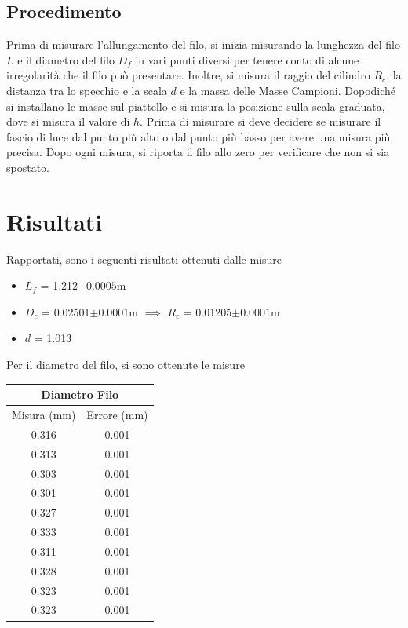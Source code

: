 \documentclass[a4paper]{article}
\begin{document}
\subsection{Procedimento}
Prima di misurare l'allungamento del filo, si inizia misurando la lunghezza del filo $L$ e il diametro del filo $D_f$ in vari punti diversi per tenere conto di alcune irregolarità che il filo può presentare. Inoltre, si misura il raggio del cilindro $R_c$, la distanza tra lo specchio e la scala $d$ e la massa delle Masse Campioni. Dopodiché si installano le masse sul piattello e si misura la posizione sulla scala graduata, dove si misura il valore di $h$. Prima di misurare si deve decidere se misurare il fascio di luce dal punto più alto o dal punto più basso per avere una misura più precisa. Dopo ogni misura, si riporta il filo allo zero per verificare che non si sia spostato. 

\section{Risultati}
Rapportati, sono i seguenti risultati ottenuti dalle misure
\begin{itemize}
    \item $L_f$ = 1.212$\pm{0.0005}$m
    \item $D_c$ = 0.02501$\pm{0.0001}$m $\implies$ $R_c$ = 0.01205$\pm{0.0001}$m
    \item $d$ = 1.013
\end{itemize}
Per il diametro del filo, si sono ottenute le misure 
\begin{table} [!h]
    \centering
    \begin{tabular}{|c|c|}
    \hline
    \multicolumn{2}{|c|}{Diametro Filo} \\
    \hline
    Misura (mm)& Errore (mm)\\
    0.316 & 0.001\\
    0.313 & 0.001\\
    0.303 & 0.001\\
    0.301 & 0.001\\
    0.327 & 0.001\\
    0.333 & 0.001\\
    0.311 & 0.001\\
    0.328 & 0.001\\
    0.323 & 0.001\\
    0.323 & 0.001\\
    \hline
    \end{tabular}
\end{table}
\FloatBarrier
\end{document}
